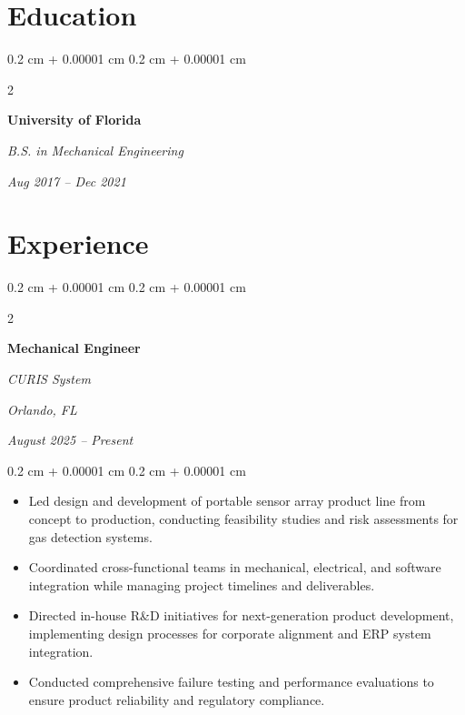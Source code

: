\documentclass[10pt, letterpaper]{article}
\newenvironment{highlights}{
    \begin{itemize}[
        topsep=0.10 cm,
        parsep=0.10 cm,
        partopsep=0pt,
        itemsep=0pt,
        leftmargin=0.4 cm + 10pt
    ]
}{
    \end{itemize}
} %
\newenvironment{onecolentry}{
    \begin{adjustwidth}{
        0.2 cm + 0.00001 cm
    }{
        0.2 cm + 0.00001 cm
    }
}{
    \end{adjustwidth}
} %
\newenvironment{twocolentry}[2][]{
    \onecolentry
    \def\secondColumn{#2}
    \setcolumnwidth{\fill, 9.0 cm}
    \begin{paracol}{2}
}{
    \switchcolumn \raggedleft \secondColumn
    \end{paracol}
    \endonecolentry
} %
\begin{document}
        \vspace{0.3 cm}

    \section{Education}

\vspace{0.2 cm}
        
        \begin{twocolentry}{
            
            
        \textit{Aug 2017 – Dec 2021}}
            \textbf{University of Florida}
            
            \textit{B.S. in Mechanical Engineering}
        \end{twocolentry}

        \vspace{0.15 cm}
        

\vspace{0.3 cm}

    
    \section{Experience}

        \vspace{0.2 cm}

        \begin{twocolentry}{
        \textit{Orlando, FL}    
            
        \textit{August 2025 – Present}}
            \textbf{Mechanical Engineer}
            
            \textit{CURIS System}
        \end{twocolentry}

        \vspace{0.10 cm}
        \begin{onecolentry}
            \begin{highlights}
                \item Led design and development of portable sensor array product line from concept to production, conducting feasibility studies and risk assessments for gas detection systems.
                \item Coordinated cross-functional teams in mechanical, electrical, and software integration while managing project timelines and deliverables.
                \item Directed in-house R\&D initiatives for next-generation product development, implementing design processes for corporate alignment and ERP system integration.
                \item Conducted comprehensive failure testing and performance evaluations to ensure product reliability and regulatory compliance.
            \end{highlights}
        \end{onecolentry}
\end{document}
